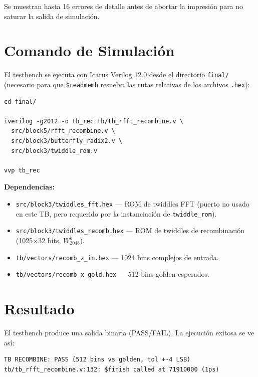 \documentclass[12pt, a4paper]{article}
\begin{document}
Se muestran hasta 16 errores de detalle antes de abortar la impresión para
no saturar la salida de simulación.

\section{Comando de Simulación}

El testbench se ejecuta con Icarus Verilog 12.0 desde el directorio
\texttt{final/} (necesario para que \texttt{\$readmemh} resuelva las rutas
relativas de los archivos \texttt{.hex}):

\begin{Verbatim}[fontsize=\footnotesize, frame=single]
cd final/

iverilog -g2012 -o tb_rec tb/tb_rfft_recombine.v \
  src/block5/rfft_recombine.v \
  src/block3/butterfly_radix2.v \
  src/block3/twiddle_rom.v

vvp tb_rec
\end{Verbatim}

\textbf{Dependencias:}
\begin{itemize}[leftmargin=*]
    \item \texttt{src/block3/twiddles\_fft.hex} — ROM de twiddles FFT
          (puerto no usado en este TB, pero requerido por la instanciación
          de \texttt{twiddle\_rom}).
    \item \texttt{src/block3/twiddles\_recomb.hex} — ROM de twiddles de
          recombinación (1025$\times$32 bits, $W_{2048}^k$).
    \item \texttt{tb/vectors/recomb\_z\_in.hex} — 1024 bins complejos de
          entrada.
    \item \texttt{tb/vectors/recomb\_x\_gold.hex} — 512 bins golden esperados.
\end{itemize}

\section{Resultado}

El testbench produce una salida binaria (PASS/FAIL). La ejecución exitosa
se ve así:

\begin{Verbatim}[fontsize=\footnotesize, frame=single]
TB RECOMBINE: PASS (512 bins vs golden, tol +-4 LSB)
tb/tb_rfft_recombine.v:132: $finish called at 71910000 (1ps)
\end{Verbatim}
\end{document}
